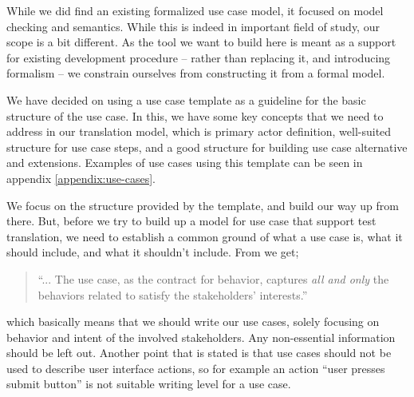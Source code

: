 \noindent While we did find an existing formalized use case model\cite{klimek2010formal}, it focused on model checking and semantics. While this is indeed in important field of study, our scope is a bit different. As the tool we want to build here is meant as a support for existing development procedure -- rather than replacing it, and introducing formalism -- we constrain ourselves from constructing it from a formal model.\medskip

\noindent We have decided on using a use case template\cite{larman2005} as a guideline for the basic structure of the use case. In this, we have some key concepts that we need to address in our translation model, which is primary actor definition, well-suited structure for use case steps, and a good structure for building use case alternative and extensions. Examples of use cases using this template can be seen in appendix \ref{appendix:use-cases}.\medskip

We focus on the structure provided by the template, and build our way up from there. But, before we try to build up a model for use case that support test translation, we need to establish a common ground of what a use case is, what it should include, and what it shouldn't include. From \cite{cockburn2000} we get;
\begin{quote}
``... The use case, as the contract for behavior, captures \emph{all and only} the behaviors related to satisfy the stakeholders’ interests.''
\end{quote}which basically means that we should write our use cases, solely focusing on behavior and intent of the involved stakeholders. Any non-essential information should be left out. Another point that is stated\cite{larman2005} is that use cases should not be used to describe user interface actions, so for example an action ``user presses submit button'' is not suitable writing level for a use case.\medskip

